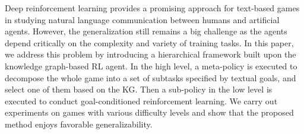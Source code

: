 Deep reinforcement learning provides a promising approach for text-based games in studying natural language communication between humans and artificial agents. However, the generalization still remains a big challenge as the agents depend critically on the complexity and variety of training tasks. In this paper, we address this problem by introducing a hierarchical framework built upon the knowledge graph-based RL agent. In the high level, a meta-policy is executed to decompose the whole game into a set of subtasks specified by textual goals, and select one of them based on the KG. Then a sub-policy in the low level is executed to conduct goal-conditioned reinforcement learning. We carry out experiments on games with various difficulty levels and show that the proposed method enjoys favorable generalizability.

